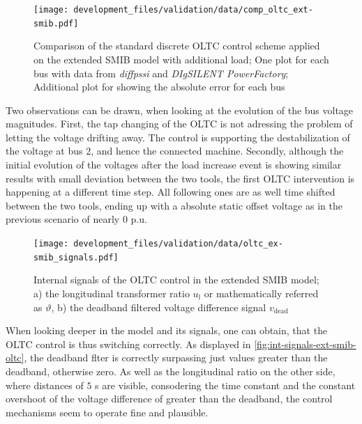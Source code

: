\begin{figure}[htbp!]
    \centering
    \texttt{[image: development\_files/validation/data/comp\_oltc\_ext-smib.pdf]}
    \caption[Bus and Error Comparison for the standard discrete \acs{OLTC} scheme applied on the extended \acs{SMIB} model with load]{Comparison of the standard discrete \acs{OLTC} control scheme applied on the extended \acs{SMIB} model with additional load; One plot for each bus with data from \textit{diffpssi} and \textit{DIgSILENT PowerFactory}; Additional plot for showing the absolute error for each bus}
    \label{fig:comp-oltc-control-ex-smib}
\end{figure}

Two observations can be drawn, when looking at the evolution of the bus voltage magnitudes.
First, the tap changing of the \acs{OLTC} is not adressing the problem of letting the voltage drifting away.
The control is supporting the destabilization of the voltage at bus 2, and hence the connected machine.
Secondly, although the initial evolution of the voltages after the load increase event is showing similar results with small deviation between the two tools, the first \acs{OLTC} intervention is happening at a different time step.
All following ones are as well time shifted between the two tools, ending up with a absolute static offset voltage as in the previous scenario of nearly $0$ p.u.

\begin{figure}[htbp!]
    \centering
    \texttt{[image: development\_files/validation/data/oltc\_ex-smib\_signals.pdf]}
    \caption[Internal signals of the \acs{OLTC} control in the extended \acs{SMIB} model]{Internal signals of the \acs{OLTC} control in the extended \acs{SMIB} model; a) the longitudinal transformer ratio $u_\mathrm{l}$ or mathematically referred as $\vartheta$, b) the deadband filtered voltage difference signal $v_\mathrm{dead}$}
    \label{fig:int-signals-ext-smib-oltc}
\end{figure}

When looking deeper in the model and its signals, one can obtain, that the \acs{OLTC} control is thus switching correctly.
As displayed in \autoref{fig:int-signals-ext-smib-oltc}, the deadband flter is correctly surpassing just values greater than the deadband, otherwise zero.
As well as the longitudinal ratio on the other side, where distances of $5$ s are visible, consodering the time constant and the constant overshoot of the voltage difference of greater than the deadband, the control mechanisms seem to operate fine and plausible.

